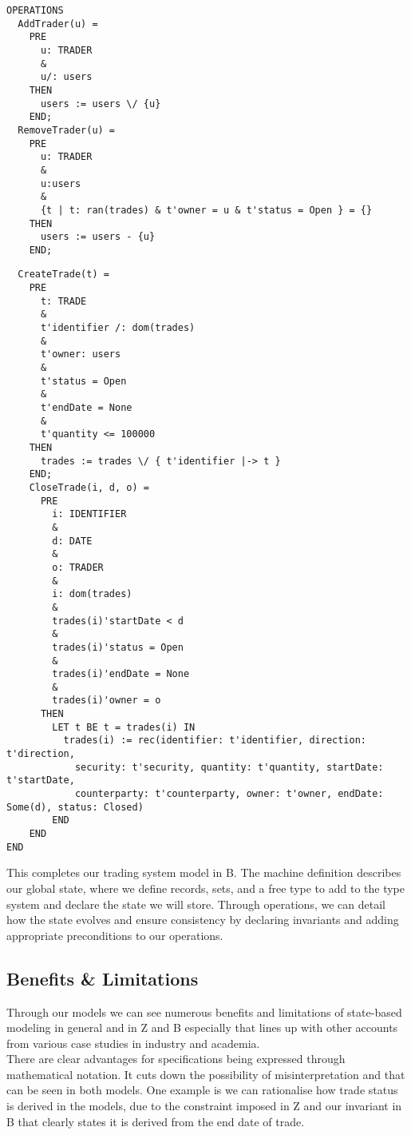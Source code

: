 \documentclass{article}
\begin{document}
\begin{verbatim}
OPERATIONS
  AddTrader(u) = 
    PRE
      u: TRADER
      &
      u/: users
    THEN
      users := users \/ {u}
    END;
  RemoveTrader(u) = 
    PRE
      u: TRADER
      &
      u:users
      &
      {t | t: ran(trades) & t'owner = u & t'status = Open } = {}
    THEN
      users := users - {u}
    END;
\end{verbatim}
\begin{verbatim}
  CreateTrade(t) =
    PRE
      t: TRADE
      &
      t'identifier /: dom(trades)
      &
      t'owner: users 
      &
      t'status = Open 
      &
      t'endDate = None 
      &
      t'quantity <= 100000
    THEN
      trades := trades \/ { t'identifier |-> t }
    END;
    CloseTrade(i, d, o) =
      PRE
        i: IDENTIFIER
        &
        d: DATE
        &
        o: TRADER
        &
        i: dom(trades)
        &
        trades(i)'startDate < d
        &
        trades(i)'status = Open
        &
        trades(i)'endDate = None
        &
        trades(i)'owner = o
      THEN
        LET t BE t = trades(i) IN
          trades(i) := rec(identifier: t'identifier, direction: t'direction, 
            security: t'security, quantity: t'quantity, startDate: t'startDate, 
            counterparty: t'counterparty, owner: t'owner, endDate: Some(d), status: Closed)
        END
    END 
END
\end{verbatim}

\hspace{-0.68cm} This completes our trading system model in B. The machine definition describes our global state, where we define records, sets, and a free type to add to the type system and declare the state we will store. Through operations, we can detail how the state evolves and ensure consistency by declaring invariants and adding appropriate preconditions to our operations.

\pagebreak
\subsection*{Benefits \& Limitations}

Through our models we can see numerous benefits and limitations of state-based modeling in general and in Z and B especially that lines up with other accounts from various case studies in industry and academia.\\
\newline
There are clear advantages for specifications being expressed through mathematical notation. It cuts down the possibility of misinterpretation and that can be seen in both models. One example is we can rationalise how trade status is derived in the models, due to the constraint imposed in Z and our invariant in B that clearly states it is derived from the end date of trade.
\end{document}
